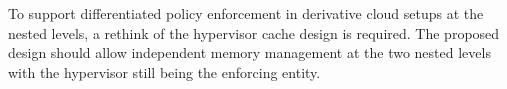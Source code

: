 %
To support differentiated policy enforcement in derivative cloud setups
at the nested levels, a rethink of the hypervisor cache design is required.    
%
The proposed design should allow independent memory management at the two 
nested levels with the hypervisor still being the enforcing entity. 
%
